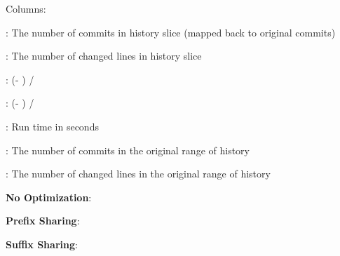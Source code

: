 \documentclass{article}
\begin{document}
%

Columns:

\TableHeadNumOfCommits: The number of commits in history slice (mapped back to original commits)

\TableHeadNumOfChangedLines: The number of changed lines in history slice

\TableHeadCommitsReduction: (\TableHeadOrigHisLen - \TableHeadNumOfCommits) / \TableHeadOrigHisLen

\TableHeadChangedLinesReduction: (\TableHeadOrigNumOfChangedLines - \TableHeadNumOfChangedLines) / \TableHeadOrigNumOfChangedLines

\TableHeadRunTime: Run time in seconds

\TableHeadOrigHisLen: The number of commits in the original range of history

\TableHeadOrigNumOfChangedLines: The number of changed lines in the original range of history
\FloatBarrier


{\setlength{\tabcolsep}{3pt}
%
%
%
%
%









}

%

\FloatBarrier

\textbf{No Optimization}: \ConfigsWithoutCache

\textbf{Prefix Sharing}: \ConfigsWithCache

\textbf{Suffix Sharing}: \ConfigsWithSuffixCache

\newpage
\clearpage



\newpage
\clearpage



%



\end{document}
